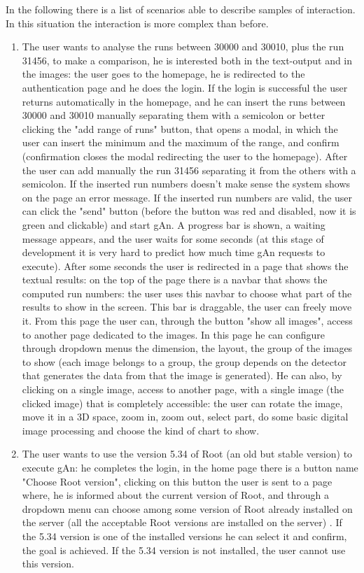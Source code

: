 In the following there is a list of scenarios able to describe samples of interaction. In this situation the interaction is more complex than before.

\begin{enumerate}

\item The user wants to analyse the runs between 30000 and 30010, plus the run 31456, to make a comparison, he is interested both in the text-output and in the images: 
the user goes to the homepage, he is redirected to the authentication page and he does the login. If the login is successful the user returns automatically in the homepage, and he can insert the runs between 30000 and 30010 manually separating them with a semicolon or better clicking the "add range of runs" button, that opens a modal, in which the user can insert the minimum and the maximum of the range, and confirm (confirmation closes the modal redirecting the user to the homepage). After the user can add manually the run 31456 separating it from the others with a semicolon. If the inserted run numbers doesn't make sense the system shows on the page an error message. If the inserted run numbers are valid, the user can click the "send" button (before the button was red and disabled, now it is green and clickable) and start gAn. A progress bar is shown, a waiting message appears, and the user waits for some seconds (at this stage of development it is very hard to predict how much time gAn requests to execute). After some seconds the user is redirected in a page that shows the textual results: on the top of the page there is a navbar that shows the computed run numbers: the user uses this navbar to choose what part of the results to show in the screen. This bar is draggable, the user can freely move it. From this page the user can, through the button "show all images", access to another page dedicated to the images. In this page he can configure through dropdown menus the dimension, the layout, the group of the images to show (each image belongs to a group, the group depends on the detector that generates the data from that the image is generated). He can also, by clicking on a single image, access to another page, with a single image (the clicked image) that is completely accessible: the user can rotate the image, move it in a 3D space, zoom in, zoom out, select part, do some basic digital image processing and choose the kind of chart to show.   

\item The user wants to use the version 5.34 of Root (an old but stable version) to execute gAn: 
he completes the login, in the home page there is a button name "Choose Root version", clicking on this button the user is sent to a page where, he is informed about the current version of Root, and through a dropdown menu can choose among some version of Root already installed on the server (all the acceptable Root versions are installed on the server) . If the 5.34 version is one of the installed versions he can select it and confirm, the goal is achieved. If the 5.34 version is not installed, the user cannot use this version.  


\end{enumerate}
